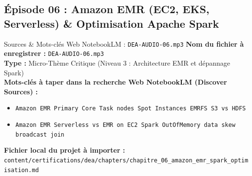 \documentclass[11pt,a4paper]{article}
\begin{document}
\subsection{Épisode 06 : Amazon EMR (EC2, EKS, Serverless) \& Optimisation Apache Spark}
\begin{sourcebox}{Sources \& Mots-clés Web NotebookLM : \texttt{DEA-AUDIO-06.mp3}}
\textbf{Nom du fichier à enregistrer :} \texttt{DEA-AUDIO-06.mp3}\\
\textbf{Type :} Micro-Thème Critique (Niveau 3 : Architecture EMR et dépannage Spark)\\
\textbf{Mots-clés à taper dans la recherche Web NotebookLM (Discover Sources) :}
\begin{itemize}[noitemsep]
    \item \texttt{Amazon EMR Primary Core Task nodes Spot Instances EMRFS S3 vs HDFS}
    \item \texttt{Amazon EMR Serverless vs EMR on EC2 Spark OutOfMemory data skew broadcast join}
\end{itemize}
\textbf{Fichier local du projet à importer :}
\texttt{content/certifications/dea/chapters/chapitre_06_amazon_emr_spark_optimisation.md}
\end{sourcebox}
\end{document}
